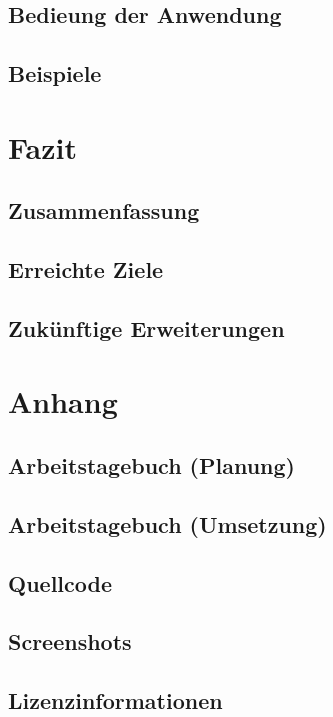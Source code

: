 \documentclass[a4paper]{article}
\begin{document}
\subsection{Bedieung der Anwendung}

\subsection{Beispiele}

\section{Fazit}

\subsection{Zusammenfassung}

\subsection{Erreichte Ziele}

\subsection{Zukünftige Erweiterungen}

\section{Anhang}

\subsection{Arbeitstagebuch (Planung)}

\subsection{Arbeitstagebuch (Umsetzung)}

\subsection{Quellcode}

\subsection{Screenshots}

\subsection{Lizenzinformationen}
\end{document}
